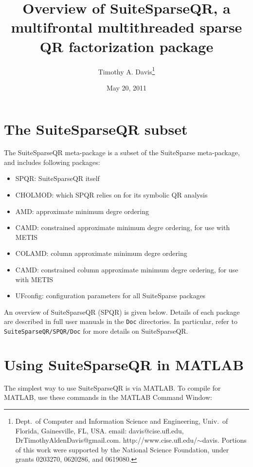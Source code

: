 \documentclass[12pt]{article}
\title{Overview of SuiteSparseQR, a multifrontal multithreaded sparse
QR factorization package}
\author{Timothy A. Davis\thanks{
Dept.~of Computer and Information Science and Engineering,
Univ.~of Florida, Gainesville, FL, USA.
email: davis@cise.ufl.edu, DrTimothyAldenDavis@gmail.com.
http://www.cise.ufl.edu/$\sim$davis.
Portions of this work were supported by the National
Science Foundation, under grants 0203270, 0620286, and 0619080.}}
\date{May 20, 2011}
\begin{document}
\maketitle

\section{The SuiteSparseQR subset}

The SuiteSparseQR meta-package is a subset of the SuiteSparse meta-package,
and includes following packages:

\begin{itemize}
\item SPQR: SuiteSparseQR itself
\item CHOLMOD: which SPQR relies on for its symbolic QR analysis
\item AMD: approximate minimum degre ordering
\item CAMD: constrained approximate minimum degre ordering, for use with METIS
\item COLAMD: column approximate minimum degre ordering
\item CAMD: constrained column approximate minimum degre ordering,
    for use with METIS
\item UFconfig: configuration parameters for all SuiteSparse packages
\end{itemize}

An overview of SuiteSparseQR (SPQR) is given below.
Details of each package are described in full user manuals
in the \verb'Doc' directories.  In particular, refer to
\verb'SuiteSparseQR/SPQR/Doc' for more details on SuiteSparseQR.


\newpage
\section{Using SuiteSparseQR in MATLAB}

The simplest way to use SuiteSparseQR is via MATLAB.  To compile for
MATLAB, use these commands in the MATLAB Command Window:
\end{document}
